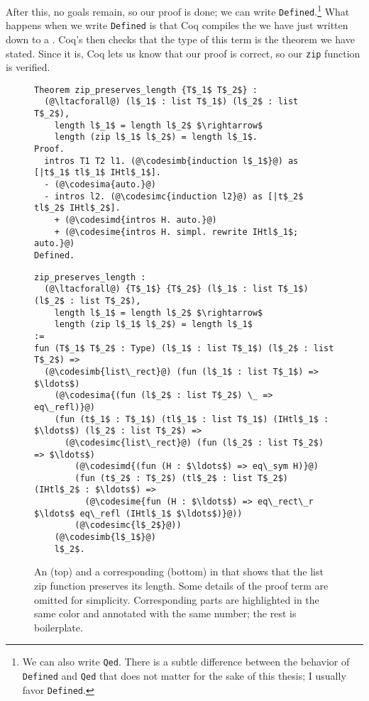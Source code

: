 After this, no goals remain, so our proof is done; we can write \lstinline{Defined}.\footnote{We can also write \lstinline{Qed}. There is a subtle
difference between the behavior of \lstinline{Defined} and \lstinline{Qed} that does not matter for the sake of this thesis; I usually favor \lstinline{Defined}.}
What happens when we write \lstinline{Defined} is that Coq compiles the  we have just written down to a .
Coq's  then checks that the type of this term is the theorem we have stated.
Since it is, Coq lets us know that our proof is correct, so our \lstinline{zip} function is verified.

\begin{figure}
\begin{lstlisting}
Theorem zip_preserves_length {T$_1$ T$_2$} :
  (@\ltacforall@) (l$_1$ : list T$_1$) (l$_2$ : list T$_2$),
    length l$_1$ = length l$_2$ $\rightarrow$
    length (zip l$_1$ l$_2$) = length l$_1$.
Proof.
  intros T1 T2 l1. (@\codesimb{induction l$_1$}@) as [|t$_1$ tl$_1$ IHtl$_1$].
  - (@\codesima{auto.}@)
  - intros l2. (@\codesimc{induction l2}@) as [|t$_2$ tl$_2$ IHtl$_2$].
    + (@\codesimd{intros H. auto.}@)
    + (@\codesime{intros H. simpl. rewrite IHtl$_1$; auto.}@)
Defined.
\end{lstlisting}
\begin{lstlisting}
zip_preserves_length :
  (@\ltacforall@) {T$_1$} {T$_2$} (l$_1$ : list T$_1$) (l$_2$ : list T$_2$),
    length l$_1$ = length l$_2$ $\rightarrow$
    length (zip l$_1$ l$_2$) = length l$_1$
:=
fun (T$_1$ T$_2$ : Type) (l$_1$ : list T$_1$) (l$_2$ : list T$_2$) =>
  (@\codesimb{list\_rect}@) (fun (l$_1$ : list T$_1$) => $\ldots$)
    (@\codesima{(fun (l$_2$ : list T$_2$) \_ => eq\_refl)}@)
    (fun (t$_1$ : T$_1$) (tl$_1$ : list T$_1$) (IHtl$_1$ : $\ldots$) (l$_2$ : list T$_2$) =>
      (@\codesimc{list\_rect}@) (fun (l$_2$ : list T$_2$) => $\ldots$)
        (@\codesimd{(fun (H : $\ldots$) => eq\_sym H)}@)
        (fun (t$_2$ : T$_2$) (tl$_2$ : list T$_2$) (IHtl$_2$ : $\ldots$) =>
          (@\codesime{fun (H : $\ldots$) => eq\_rect\_r $\ldots$ eq\_refl (IHtl$_1$ $\ldots$)}@))
        (@\codesimc{l$_2$}@))
    (@\codesimb{l$_1$}@)
    l$_2$.
\end{lstlisting}
\caption{An   (top) and a corresponding   (bottom) in  that shows that the list zip function preserves its length.
Some details of the proof term are omitted for simplicity.
Corresponding parts are highlighted in the same color and annotated with the same number; the rest is boilerplate.}
\label{fig:zip-proof}
\end{figure}

